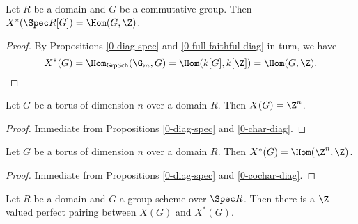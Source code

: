 \begin{proposition}
  \label{0-cochar-diag}
  \leanok

  Let $R$ be a domain and $G$ be a commutative group.
  Then $X^*(\Spec R[G]) = \Hom(G, \Z)$.
\end{proposition}
\begin{proof}
  \leanok

  By Propositions \ref{0-diag-spec} and \ref{0-full-faithful-diag} in turn, we have
  \[
    X^*(G) = \Hom_{\mathsf{GrpSch}}(\G_m, G) = \Hom(k[G], k[\Z]) = \Hom(G, \Z).
  \]
\end{proof}


\begin{proposition}
  \label{0-char-torus}
  \leanok

  Let $G$ be a torus of dimension $n$ over a domain $R$.
  Then $X(G) = \Z^n$.
\end{proposition}
\begin{proof}
  \leanok

  Immediate from Propositions \ref{0-diag-spec} and \ref{0-char-diag}.
\end{proof}


\begin{proposition}
  \label{0-cochar-torus}
  \leanok

  Let $G$ be a torus of dimension $n$ over a domain $R$.
  Then $X^*(G) = \Hom(\Z^n, \Z)$.
\end{proposition}
\begin{proof}
  \leanok

  Immediate from Propositions \ref{0-diag-spec} and \ref{0-cochar-diag}.
\end{proof}


\begin{definition}
  \label{0-char-cochar-pairing}
  \leanok

  Let $R$ be a domain and $G$ a group scheme over $\Spec R$.
  Then there is a $\Z$-valued perfect pairing between $X(G)$ and $X^*(G)$.
\end{definition}


